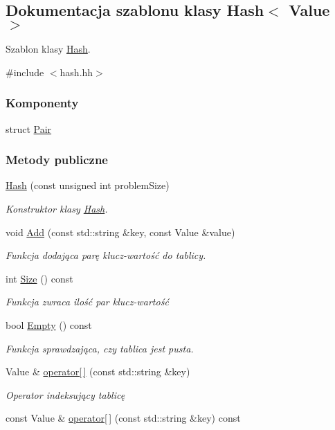 \hypertarget{class_hash}{\subsection{Dokumentacja szablonu klasy Hash$<$ Value $>$}
\label{class_hash}
}


Szablon klasy \hyperlink{class_hash}{Hash}.  




{\ttfamily \#include $<$hash.\-hh$>$}

\subsubsection*{Komponenty}
\begin{DoxyCompactItemize}
\item 
struct \hyperlink{struct_hash_1_1_pair}{Pair}
\end{DoxyCompactItemize}
\subsubsection*{Metody publiczne}
\begin{DoxyCompactItemize}
\item 
\hyperlink{class_hash_a676da4ca6e3a3cd3ca09fe3952354f7a}{Hash} (const unsigned int problem\-Size)
\begin{DoxyCompactList}\small\item\em Konstruktor klasy \hyperlink{class_hash}{Hash}. \end{DoxyCompactList}\item 
void \hyperlink{class_hash_af814288cbf21f27c8c7a7a7c23b7226b}{Add} (const std\-::string \&key, const Value \&value)
\begin{DoxyCompactList}\small\item\em Funkcja dodająca parę klucz-\/wartość do tablicy. \end{DoxyCompactList}\item 
int \hyperlink{class_hash_a955fb594f7fcbbbd4628676ac85b6f8c}{Size} () const 
\begin{DoxyCompactList}\small\item\em Funkcja zwraca ilość par klucz-\/wartość \end{DoxyCompactList}\item 
bool \hyperlink{class_hash_a37a5220a607118cef8ab39c71451aac7}{Empty} () const 
\begin{DoxyCompactList}\small\item\em Funkcja sprawdzająca, czy tablica jest pusta. \end{DoxyCompactList}\item 
Value \& \hyperlink{class_hash_a6b08c6a3d82a57af2bc6328398594226}{operator\mbox{[}$\,$\mbox{]}} (const std\-::string \&key)
\begin{DoxyCompactList}\small\item\em Operator indeksujący tablicę \end{DoxyCompactList}\item 
const Value \& \hyperlink{class_hash_a12db087ef9fd704ba292691ae4b32a2a}{operator\mbox{[}$\,$\mbox{]}} (const std\-::string \&key) const 
\end{DoxyCompactItemize}
